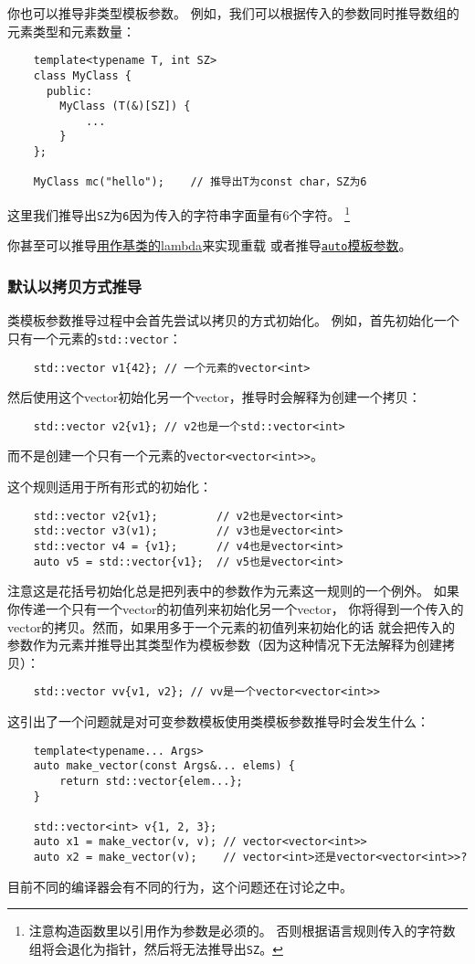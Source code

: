 你也可以推导非类型模板参数。
例如，我们可以根据传入的参数同时推导数组的元素类型和元素数量：
\begin{lstlisting}
    template<typename T, int SZ>
    class MyClass {
      public:
        MyClass (T(&)[SZ]) {
            ...
        }
    };

    MyClass mc("hello");    // 推导出T为const char，SZ为6
\end{lstlisting}
这里我们推导出\texttt{SZ}为\texttt{6}因为传入的字符串字面量有6个字符。
\footnote{注意构造函数里以引用作为参数是必须的。
否则根据语言规则传入的字符数组将会退化为指针，然后将无法推导出\texttt{SZ}。}

你甚至可以推导\hyperref[ch14.1]{用作基类的lambda}来实现重载
或者推导\hyperref[ch13.1]{\texttt{auto}模板参数}。

\subsubsection{默认以拷贝方式推导}\label{ch9.1.1}
类模板参数推导过程中会首先尝试以拷贝的方式初始化。
例如，首先初始化一个只有一个元素的\texttt{std::vector}：
\begin{lstlisting}
    std::vector v1{42}; // 一个元素的vector<int>
\end{lstlisting}
然后使用这个vector初始化另一个vector，推导时会解释为创建一个拷贝：
\begin{lstlisting}
    std::vector v2{v1}; // v2也是一个std::vector<int>
\end{lstlisting}
而不是创建一个只有一个元素的\texttt{vector<vector<int>>}。

这个规则适用于所有形式的初始化：
\begin{lstlisting}
    std::vector v2{v1};         // v2也是vector<int>
    std::vector v3(v1);         // v3也是vector<int>
    std::vector v4 = {v1};      // v4也是vector<int>
    auto v5 = std::vector{v1};  // v5也是vector<int>
\end{lstlisting}
注意这是花括号初始化总是把列表中的参数作为元素这一规则的一个例外。
如果你传递一个只有一个vector的初值列来初始化另一个vector，
你将得到一个传入的vector的拷贝。然而，如果用多于一个元素的初值列来初始化的话
就会把传入的参数作为元素并推导出其类型作为模板参数（因为这种情况下无法解释为创建拷贝）：
\begin{lstlisting}
    std::vector vv{v1, v2}; // vv是一个vector<vector<int>>
\end{lstlisting}
这引出了一个问题就是对可变参数模板使用类模板参数推导时会发生什么：
\begin{lstlisting}
    template<typename... Args>
    auto make_vector(const Args&... elems) {
        return std::vector{elem...};
    }

    std::vector<int> v{1, 2, 3};
    auto x1 = make_vector(v, v); // vector<vector<int>>
    auto x2 = make_vector(v);    // vector<int>还是vector<vector<int>>?
\end{lstlisting}
目前不同的编译器会有不同的行为，这个问题还在讨论之中。

